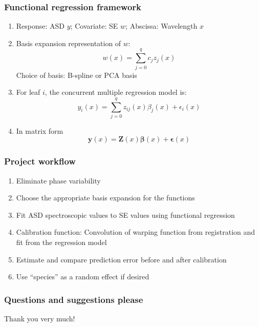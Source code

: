 \documentclass[10pt,dvipsnames,table]{beamer}
\begin{document}
\begin{frame}
\frametitle{Functional regression framework}
\begin{enumerate}
\item Response: ASD $y$; Covariate: SE $w$; Abscissa: Wavelength $x$
\item Basis expansion representation of $w$:
\[w(x) = \sum \limits_{j=0}^{q} c_j z_j(x)\]
Choice of basis: B-spline or PCA basis
\item For leaf $i$, the concurrent multiple regression model is:
\[ y_i(x) = \sum \limits_{j=0}^{q} z_{ij}(x)\beta_j(x) + \epsilon_i(x) \]
\item In matrix form
\[ \mathbf{y}(x) = \mathbf{Z}(x)\mathbf{\beta}(x) + \mathbf{\epsilon}(x)\]
\end{enumerate}
\end{frame}

\begin{frame}
\frametitle{Project workflow}
\begin{enumerate}
\item Eliminate phase variability
\item Choose the appropriate basis expansion for the functions
\item Fit ASD spectroscopic values to SE values using functional regression
\item Calibration function: Convolution of warping function from registration and fit from the regression model
\item Estimate and compare prediction error before and after calibration 
\item Use ``species'' as a random effect if desired
\end{enumerate}
\end{frame}

\begin{frame}
\frametitle{Questions and suggestions please}

Thank you very much!

\end{frame}

\end{document}

